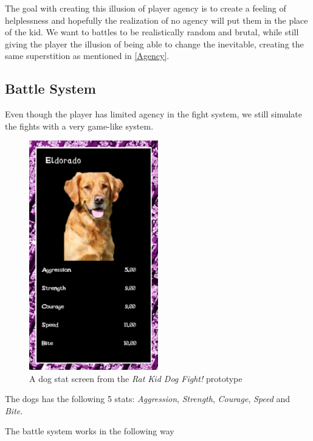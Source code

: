 The goal with creating this illusion of player agency is to create a feeling of helplessness and hopefully the realization of no agency will put them in the place of the kid. 
We want to battles to be realistically random and brutal, while still giving the player the illusion of being able to change the inevitable, creating the same superstition as mentioned in \ref{Agency}.\

\subsection{Battle System}
Even though the player has limited agency in the fight system, we still simulate the fights with a very game-like system.\

\begin{figure}[h!]
	\centering
    \includegraphics[width=0.5\textwidth]{DogStats.png}
    \caption{A dog stat screen from the \textit{Rat Kid Dog Fight!} prototype}
    \label{fig:DogStatScreen}
\end{figure}


The dogs has the following 5 stats: \textit{Aggression}, \textit{Strength}, \textit{Courage}, \textit{Speed} and \textit{Bite}.\

The battle system works in the following way



